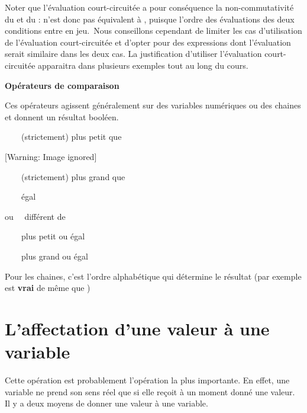 {
Noter que l’évaluation court-circuitée a pour conséquence la
non-commutativité du  et du
:  n’est donc
pas équivalent à , puisque l’ordre
des évaluations des deux conditions entre en jeu.~Nous conseillons
cependant de limiter les cas d’utilisation de l’évaluation
court-circuitée et d'opter pour des expressions dont
l’évaluation serait similaire dans les deux cas. La justification
d’utiliser l’évaluation court-circuitée apparaitra dans plusieurs
exemples tout au long du cours. }

{\sffamily\bfseries
Opérateurs de comparaison}

{
Ces opérateurs agissent généralement sur des variables numériques ou des
chaines et donnent un résultat booléen. }

{
\textstyleCodeInsr{{\textless}} \ \ \ \ (strictement) plus petit que}

\begin{center}
 [Warning: Image ignored] %

\end{center}
{
\textstyleCodeInsr{{\textgreater}} \ \ \ \ (strictement) plus grand que}

{
\textstyleCodeInsr{=} \ \ \ \ égal}

{
\textstyleCodeInsr{{\textless}{\textgreater}} ou
\textstyleCodeInsr{${\neq}$} \ \ différent de}

{
\textstyleCodeInsr{${\leq}$}\ \ \ \ plus petit ou égal}

{
\textstyleCodeInsr{${\geq}$}\ \ \ \ plus grand ou égal}

{
Pour les chaines, c'est l’ordre alphabétique qui
détermine le résultat (par exemple
 est \textbf{vrai} de même que
\textstyleCodeInsr{${\leq}$})}

\section{L’affectation d’une valeur à une variable}
{
Cette opération est probablement l’opération la plus importante. En
effet, une variable ne prend son sens réel que si elle reçoit à un
moment donné une valeur. Il y a deux moyens de donner une valeur à une
variable.}


